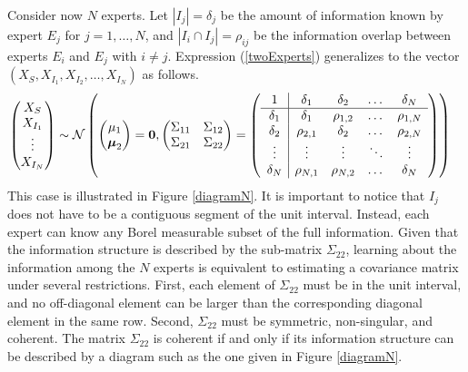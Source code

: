 \documentclass[11pt]{article}
\theoremstyle{definition}
\theoremstyle{definition}
\begin{document}
Consider now $N$ experts. Let $|I_j| = \delta_j$ be the amount of information known by expert $E_j$ for $j = 1, \dots, N$, and $|I_i \cap I_j| = \rho_{ij}$ be the information overlap between experts $E_i$ and $E_j$ with $i \neq j$. Expression (\ref{twoExperts}) generalizes to the vector $(X_{S}, X_{I_1}, X_{I_2}, \dots, X_{I_N})$ as follows.
\begin{align}
\left(\begin{matrix} X_S \\ X_{I_1}\\ \vdots \\ X_{I_N} \end{matrix}\right) &\sim \mathcal{N}\left( \left(\begin{matrix} 
\mu_1 \\ \boldsymbol{\mu}_2
 \end{matrix}\right) =
 \boldsymbol{0}, \left(\begin{matrix} 
\Sigma_{11} & \Sigma_{12}\\
\Sigma_{21} & \Sigma_{22}\\
 \end{matrix}\right) 
 =
 \left(\begin{array}{c | c c cc }
1 & \delta_1 & \delta_2 & \dots & \delta_N  \\ \hline
\delta_1 & \delta_1 &\rho_{1,2} & \dots & \rho_{1,N}   \\ 
\delta_2 & \rho_{2,1} & \delta_2 & \dots & \rho_{2,N}  \\ 
\vdots & \vdots & \vdots & \ddots & \vdots  \\ 
\delta_N & \rho_{N,1} & \rho_{N,2} & \dots & \delta_N\\ 
 \end{array}\right)\right)  \label{NExperts}
\end{align}
This case is illustrated in Figure \ref{diagramN}. It is important to notice that $I_j$ does not have to be a contiguous segment of the unit interval. Instead, each expert can know any Borel measurable subset of the full information. Given that the information structure is described by the sub-matrix $\Sigma_{22}$, learning about the information among the $N$ experts is equivalent to estimating a covariance matrix under several restrictions. First, each element of $\Sigma_{22}$ must be in the unit interval, and no off-diagonal element can be larger than the corresponding diagonal element in the same row. Second, $\Sigma_{22}$ must be symmetric, non-singular, and coherent. The matrix $\Sigma_{22}$ is coherent if and only if its information structure can be described by a diagram such as the one given in Figure \ref{diagramN}. 
\end{document}
